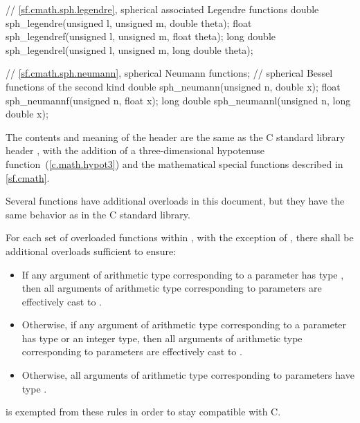\begin{codeblock}
{  // \ref{sf.cmath.sph.legendre}, spherical associated Legendre functions
  double       sph_legendre(unsigned l, unsigned m, double theta);
  float        sph_legendref(unsigned l, unsigned m, float theta);
  long double  sph_legendrel(unsigned l, unsigned m, long double theta);

  // \ref{sf.cmath.sph.neumann}, spherical Neumann functions;
  // spherical Bessel functions of the second kind
  double       sph_neumann(unsigned n, double x);
  float        sph_neumannf(unsigned n, float x);
  long double  sph_neumannl(unsigned n, long double x);
}
\end{codeblock}

\pnum
The contents and meaning of the header 
are the same as the C standard library header ,
with the addition of
a three-dimensional hypotenuse function~(\ref{c.math.hypot3}) and
the mathematical special functions described in \ref{sf.cmath}.
\begin{note}
Several functions have additional overloads in this document,
but they have the same behavior as in the C standard library.
\end{note}

\pnum
For each set of overloaded functions within ,
with the exception of ,
there shall be additional overloads sufficient to ensure:
\begin{itemize}
  \item If any argument of arithmetic type
    corresponding to a  parameter
    has type ,
    then all arguments of arithmetic type
    corresponding to  parameters
    are effectively cast to .
  \item Otherwise, if any argument of arithmetic type
    corresponding to a  parameter
    has type 
    or an integer type,
    then all arguments of arithmetic type
    corresponding to  parameters
    are effectively cast to .
  \item
\begin{note}
Otherwise, all arguments of arithmetic type
corresponding to  parameters
have type .
\end{note}
\end{itemize}
\begin{note}
 is exempted from these rules in order to stay compatible with C.
\end{note}

